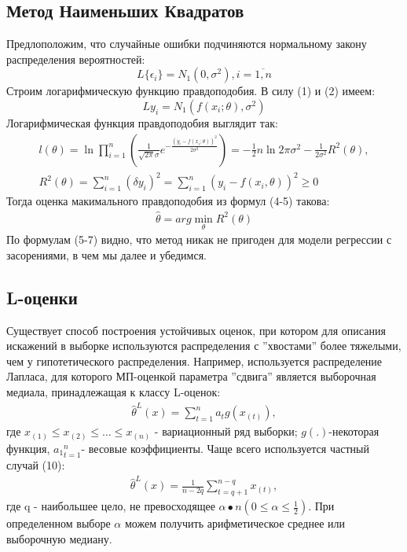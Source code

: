 \documentclass[12pt]{article}
\begin{document}
\subsection{Метод Наименьших Квадратов}
Предлоположим, что случайные ошибки подчиняются нормальному закону распределения вероятностей:
\begin{equation}
    L\{\epsilon_i\}=N_1(0,\sigma^2), i = \overline{1,n}
\end{equation}
Строим логарифмическую функцию правдоподобия. В силу (1) и (2) имеем:
\begin{equation}
    L{y_i}=N_1(f(x_i;\theta), \sigma^2)
\end{equation}
Логарифмическая функция правдоподобия выглядит так\cite{Kharin}:
\begin{eqnarray}
    l(\theta)=\ln \prod_{i=1}^{n}(\frac{1}{\sqrt{2\pi}\sigma}e^{-\frac{(y_i-f(x_i;\theta))^2}{2\sigma^2}})=-\frac{1}{2}n\ln{2\pi\sigma^2}-\frac{1}{2\sigma^2}R^2(\theta),\\
    R^2(\theta)=\sum_{i=1}^{n}(\delta y_i)^2=\sum_{i=1}^{n}(y_i-f(x_i,\theta))^2\geq 0
\end{eqnarray}
Тогда оценка макимального правдоподобия из формул (4-5) такова:
\begin{eqnarray}
    \hat{\theta}=arg \min_{\theta}R^2(\theta)
\end{eqnarray}
По формулам (5-7) видно, что метод никак не пригоден для модели регрессии с засорениями, в чем мы далее и убедимся.

\subsection{L-оценки}
Существует способ построения устойчивых оценок, при котором для описания искажений в выборке используются распределения с ''хвостами'' более тяжелыми, чем у гипотетического распределения.
Например, используется распределение Лапласа, для которого МП-оценкой параметра ''сдвига'' является выборочная медиала, принадлежащая к классу L-оценок:
\begin{eqnarray}
    \hat{\theta}^L(x)=\sum_{t=1}^n a_tg(x_{(t)}),
\end{eqnarray}
где $x_{(1)}\leq x_{(2)} \leq \dots \leq x_{(n)}$ - вариационный ряд выборки; $g(.)$-некоторая функция, ${a_1}_{t=1}^n$- весовые коэффициенты.\hfill\break
Чаще всего используется частный случай (10):
\begin{eqnarray}
    \hat{\theta}^L(x)=\frac{1}{n-2q}\sum_{t=q+1}^{n-q}x_{(t)},
\end{eqnarray}
где q - наибольшее цело, не превосходящее $\alpha \bullet n (0\leq \alpha \leq \frac{1}{2})$.
При определенном выборе $\alpha$ можем получить арифметическое среднее или выборочную медиану.
\end{document}
